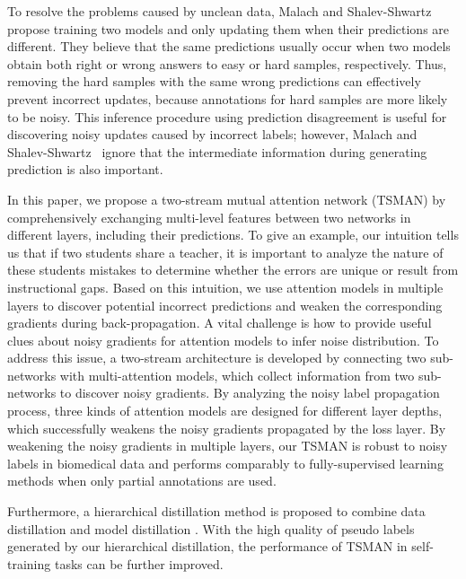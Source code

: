\documentclass[letterpaper]{article} %
\begin{document}
To resolve the problems caused by unclean data, Malach and Shalev-Shwartz~ propose training two models and only updating them when their predictions are different.
They believe that the same predictions usually occur when two models obtain both right or wrong answers to easy or hard samples, respectively.
Thus, removing the hard samples with the same wrong predictions can effectively prevent incorrect updates, because annotations for hard samples are more likely to be noisy.
This inference procedure using prediction disagreement is useful for discovering noisy updates caused by incorrect labels; however, Malach and Shalev-Shwartz~ ignore that the intermediate information during generating prediction is also important.

In this paper, we propose a two-stream mutual attention network (TSMAN) by comprehensively exchanging multi-level features between two networks in different layers, including their predictions.
To give an example, our intuition tells us that if two students share a teacher, it is important to analyze the nature of these students mistakes to determine whether the errors are unique or result from instructional gaps.
Based on this intuition, we use attention models in multiple layers to discover potential incorrect predictions and weaken the corresponding gradients during back-propagation. 
A vital challenge is how to provide useful clues about noisy gradients for attention models to infer noise distribution.
To address this issue, a two-stream architecture is developed by connecting two sub-networks with multi-attention models, which collect information from two sub-networks to discover noisy gradients.
By analyzing the noisy label propagation process, three kinds of attention models are designed for different layer depths, which successfully weakens the noisy gradients propagated by the loss layer.
By weakening the noisy gradients in multiple layers, our TSMAN is robust to noisy labels in biomedical data and performs comparably to fully-supervised learning methods when only partial annotations are used.

Furthermore, a hierarchical distillation method is proposed to combine data distillation \cite{Radosavovic_2018_CVPR} and model distillation \cite{Hansen1990}.
With the high quality of pseudo labels generated by our hierarchical distillation, the performance of TSMAN in self-training tasks can be further improved.
\end{document}
